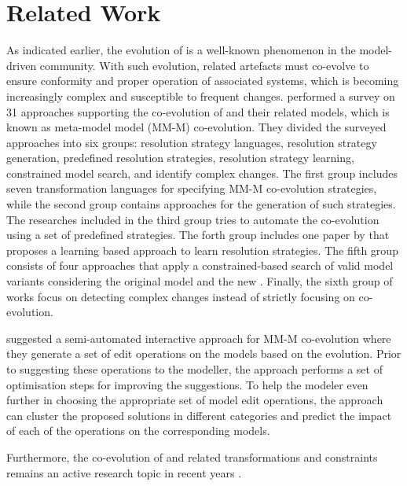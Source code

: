 \section{Related Work} \label{sec:RW}

As indicated earlier, the evolution of \metamodels is a well-known phenomenon in the model-driven community. With such evolution, related artefacts must co-evolve to ensure conformity and proper operation of associated systems, which is becoming increasingly complex and susceptible to frequent changes. \Textcite{Hebig2017} performed a survey on 31 approaches supporting the co-evolution of \metamodels and their related models, which is known as meta-model model (MM-M) co-evolution. They divided the surveyed approaches into six groups: resolution strategy languages, resolution strategy generation, predefined resolution strategies, resolution strategy learning, constrained model search, and identify complex changes. The first group includes seven transformation languages for specifying MM-M co-evolution strategies, while the second group contains approaches for the generation of such strategies. The researches included in the third group tries to automate the co-evolution using a set of predefined strategies. The forth group includes one paper by \textcite{Anguel2013} that proposes a learning based approach to learn resolution strategies. The fifth group consists of four approaches that apply a constrained-based search of valid model variants considering the original model and the new \metamodel. Finally, the sixth group of works focus on detecting complex \metamodel changes instead of strictly focusing on co-evolution.

\Textcite{Kessentini2022} suggested a semi-automated interactive approach for MM-M co-evolution where they generate a set of edit operations on the models based on the \metamodel evolution. Prior to suggesting these operations to the modeller, the approach performs a set of optimisation steps for improving the suggestions. To help the modeler even further in choosing the appropriate set of model edit operations, the approach can cluster the proposed solutions in different categories and predict the impact of each of the operations on the corresponding models.

Furthermore, the co-evolution of \metamodel and related transformations and constraints remains an active research topic in recent years \cite{Kusel2015, Khelladi2017, garcia2013}.

